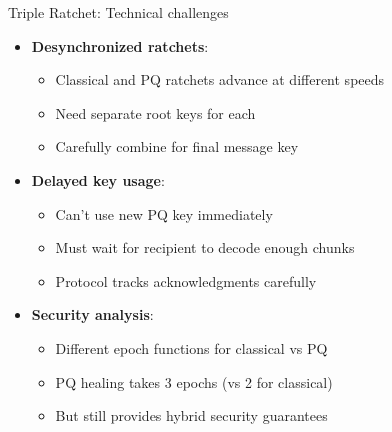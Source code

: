 \documentclass[aspectratio=169, lualatex, handout]{beamer}
\begin{document}
\begin{frame}{Triple Ratchet: Technical challenges}
	\begin{itemize}
		\item \textbf{Desynchronized ratchets}:
		      \begin{itemize}
			      \item Classical and PQ ratchets advance at different speeds
			      \item Need separate root keys for each
			      \item Carefully combine for final message key
		      \end{itemize}
		\item \textbf{Delayed key usage}:
		      \begin{itemize}
			      \item Can't use new PQ key immediately
			      \item Must wait for recipient to decode enough chunks
			      \item Protocol tracks acknowledgments carefully
		      \end{itemize}
		\item \textbf{Security analysis}:
		      \begin{itemize}
			      \item Different epoch functions for classical vs PQ
			      \item PQ healing takes 3 epochs (vs 2 for classical)
			      \item But still provides hybrid security guarantees
		      \end{itemize}
	\end{itemize}
\end{frame}
\end{document}
